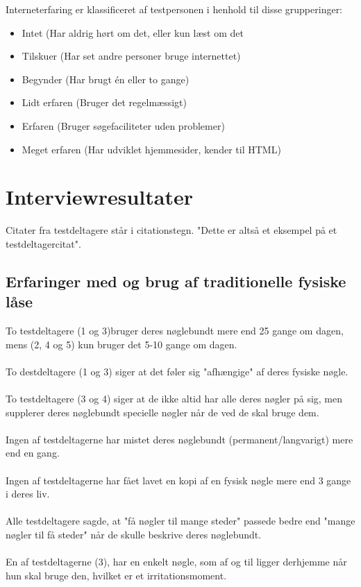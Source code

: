 \documentclass[a4paper,12pt]{article}
\begin{document}
Interneterfaring er klassificeret af testpersonen i henhold til disse grupperinger:
\begin{itemize}


\item Intet (Har aldrig hørt om det, eller kun læst om det 
\item Tilskuer (Har set andre personer bruge internettet)  
\item Begynder (Har brugt én eller to gange)
\item Lidt erfaren (Bruger det regelmæssigt)
\item Erfaren (Bruger søgefaciliteter uden problemer)
\item Meget erfaren (Har udviklet hjemmesider, kender til HTML)

\end{itemize}

\section{Interviewresultater}
Citater fra testdeltagere står i citationstegn. "Dette er altså et eksempel på et testdeltagercitat".
\subsection{Erfaringer med og brug af traditionelle fysiske låse}

To testdeltagere (1 og 3)bruger deres nøglebundt mere end 25 gange om dagen, mens (2, 4 og 5) kun bruger det 5-10 gange om dagen.
\\ \\
To destdeltagere (1 og 3) siger at det føler sig "afhængige" af deres fysiske nøgle.
\\ \\
To testdeltagere (3 og 4) siger at de ikke altid har alle deres nøgler på sig, men supplerer deres nøglebundt specielle nøgler når de ved de skal bruge dem.
\\ \\
Ingen af testdeltagerne har mistet deres nøglebundt (permanent/langvarigt) mere end en gang.
\\ \\
Ingen af testdeltagerne har fået lavet en kopi af en fysisk nøgle mere end 3 gange i deres liv.
\\ \\
Alle testdeltagere sagde, at "få nøgler til mange steder" passede bedre end "mange nøgler til få steder" når de skulle beskrive deres nøglebundt.
\\ \\
En af testdeltagerne (3), har en enkelt nøgle, som af og til ligger derhjemme når hun skal bruge den, hvilket er et irritationsmoment.
\end{document}
